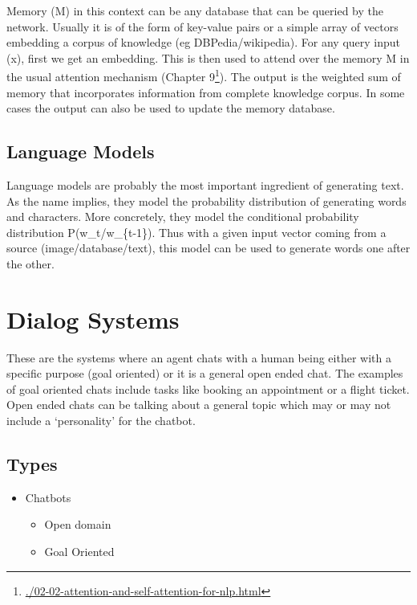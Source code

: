 \documentclass[]{krantz}
\providecommand{\tightlist}{%
  \setlength{\itemsep}{0pt}\setlength{\parskip}{0pt}}
\renewcommand{\href}[2]{#2\footnote{\url{#1}}}
\begin{document}
Memory (M) in this context can be any database that can be queried by the network. Usually it is of the form of key-value pairs or a simple array of vectors embedding a corpus of knowledge (eg DBPedia/wikipedia). For any query input (x), first we get an embedding. This is then used to attend over the memory M in the usual attention mechanism (\href{./02-02-attention-and-self-attention-for-nlp.html}{Chapter 9}). The output is the weighted sum of memory that incorporates information from complete knowledge corpus. In some cases the output can also be used to update the memory database.

\hypertarget{language-models}{%
\subsection{Language Models}\label{language-models}}

Language models are probably the most important ingredient of generating text. As the name implies, they model the probability distribution of generating words and characters. More concretely, they model the conditional probability distribution P(w\_t/w\_\{t-1\}). Thus with a given input vector coming from a source (image/database/text), this model can be used to generate words one after the other.

\hypertarget{dialog-systems}{%
\section{Dialog Systems}\label{dialog-systems}}

These are the systems where an agent chats with a human being either with a specific purpose (goal oriented) or it is a general open ended chat. The examples of goal oriented chats include tasks like booking an appointment or a flight ticket. Open ended chats can be talking about a general topic which may or may not include a `personality' for the chatbot.

\hypertarget{types}{%
\subsection{Types}\label{types}}

\begin{itemize}
\tightlist
\item
  Chatbots

  \begin{itemize}
  \tightlist
  \item
    Open domain
  \item
    Goal Oriented
  \end{itemize}
\end{itemize}
\end{document}
